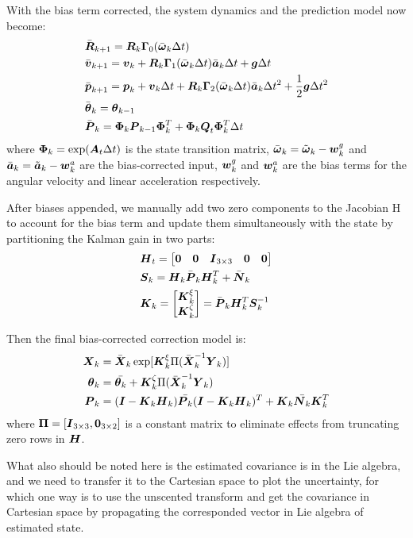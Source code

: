 With the bias term corrected, the system dynamics and the prediction model now become:
\begin{align}
    & \bar{\boldsymbol{R}}_{k+1} = \boldsymbol{R}_{k} \boldsymbol{\Gamma}_0 (\bar{\boldsymbol{\omega}}_k \Delta t) \\
    & \bar{\boldsymbol{v}}_{k+1} = \boldsymbol{v}_k + \boldsymbol{R}_{k} \boldsymbol{\Gamma}_1 (\bar{\boldsymbol{\omega}}_k \Delta t) \bar{\boldsymbol{a}}_k \Delta t + \boldsymbol{g} \Delta t \\
    & \bar{\boldsymbol{p}}_{k+1} = \boldsymbol{p}_k + \boldsymbol{v}_k \Delta t + \boldsymbol{R}_{k} \boldsymbol{\Gamma}_2 (\bar{\boldsymbol{\omega}}_k \Delta t) \bar{\boldsymbol{a}}_k \Delta t^2 + \frac{1}{2}\boldsymbol{g} \Delta t^2\\
    &\bar{\boldsymbol{\theta}}_k = \boldsymbol{\theta}_{k-1}\\
    & \bar{\boldsymbol{P}}_k=\boldsymbol{\Phi}_k\boldsymbol{P}_{k-1}\boldsymbol{\Phi}_k^T + \boldsymbol{\Phi}_k\boldsymbol{Q}_{t}\boldsymbol{\Phi}_k^T\Delta t
\end{align}
where $\boldsymbol{\Phi}_k=\exp(\boldsymbol{A}_t\Delta t)$ is the state transition matrix, $\bar{\boldsymbol{\omega}}_k = \tilde{\boldsymbol{\omega}}_k-\boldsymbol{w}^g_k$ and $\bar{\boldsymbol{a}}_k = \tilde{\boldsymbol{a}}_k-\boldsymbol{w}^a_k$ are the bias-corrected input, $\boldsymbol{w}^g_k$ and $\boldsymbol{w}^a_k$ are the bias terms for the angular velocity and linear acceleration respectively.

After biases appended, we manually add two zero components to the Jacobian H to account for the bias term and update them simultaneously with the state by partitioning the Kalman gain in two parts:
\begin{align}
    & \boldsymbol{H}_t = 
    \begin{bmatrix}
        \boldsymbol{0} & \boldsymbol{0} & \boldsymbol{I}_{3 \times 3} & \boldsymbol{0} & \boldsymbol{0}
    \end{bmatrix}\\
    &     \boldsymbol{S}_k=\boldsymbol{H}_k\bar{\boldsymbol{P}}_k\boldsymbol{H}_k^T+\bar{\boldsymbol{N}}_k\\
    & \boldsymbol{K}_k=\begin{bmatrix}\boldsymbol{K}_k^\xi\\\boldsymbol{K}_k^\zeta\end{bmatrix}=\bar{\boldsymbol{P}}_k\boldsymbol{H}_k^T\boldsymbol{S}_k^{-1}
\end{align}

Then the final bias-corrected correction model is:
\begin{align}
    \boldsymbol{X}_k&=\bar{\boldsymbol{X}}_k\exp[\boldsymbol{K}_k^\xi\Pi(\bar{\boldsymbol{X}}_k^{-1}\boldsymbol{Y}_k)]\\
    \boldsymbol{\theta}_k&=\bar{\boldsymbol{\theta}_k}+\boldsymbol{K}_k^\zeta\Pi(\bar{\boldsymbol{X}}_k^{-1}\boldsymbol{Y}_k)\\
    \boldsymbol{P}_k&=(\boldsymbol{I}-\boldsymbol{K}_k\boldsymbol{H}_k)\bar{\boldsymbol{P}_k}(\boldsymbol{I}-\boldsymbol{K}_k\boldsymbol{H}_k)^T+\boldsymbol{K}_k\bar{\boldsymbol{N}_k}\boldsymbol{K}_k^T
\end{align}
where $\boldsymbol{\Pi} = [\boldsymbol{I}_{3 \times 3},  \boldsymbol{0}_{3 \times 2}]$ is a constant matrix to eliminate effects from truncating zero rows in $\boldsymbol{H}$.

What also should be noted here is the estimated covariance is in the Lie algebra, and we need to transfer it to the Cartesian space to plot the uncertainty, for which one way is to use the unscented transform and get the covariance in Cartesian space by propagating the corresponded vector in Lie algebra of estimated state.
